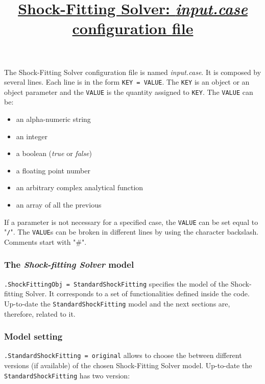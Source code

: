 \documentclass[11pt,a4paper,oneside]{article}
\begin{document}
\title{\underline{Shock-Fitting Solver: \textit{input.case} configuration file}}
\date{}
\maketitle
The Shock-Fitting Solver configuration file is named \textit{input.case}. 
It is composed by several lines. 
Each line is in the form \texttt{KEY = VALUE}.
The \texttt{KEY} is an object or an object parameter and the \texttt{VALUE} is the quantity assigned to \texttt{KEY}.
\newline
\newline
The \texttt{VALUE} can be:

\begin{itemize}
\item{an alpha-numeric string}
\item{an integer}
\item{a boolean (\textit{true} or \textit{false})}
\item{a floating point number}
\item{an arbitrary complex analytical function}
\item{an array of all the previous}
\end{itemize}

If a parameter is not necessary for a specified case, the \texttt{VALUE} can be set equal to "\texttt{/}".
The \texttt{VALUE}s can be broken in different lines by using the character backslash.
Comments start with "\#".


\subsubsection*{The \textit{Shock-fitting Solver} model}

\hspace*{1cm} \texttt{.ShockFittingObj = StandardShockFitting}
\newline
\newline
specifies the model of the Shock-fitting Solver. It corresponds to a set of functionalities defined inside the code.
Up-to-date the \texttt{StandardShockFitting} model and the next sections are, therefore, related to it.

\subsubsection*{Model setting}

\hspace*{1cm} \texttt{.StandardShockFitting = original}
\newline
\newline
allows to choose the between different versions (if available) of the chosen Shock-Fitting Solver model. 
\newline
Up-to-date the \texttt{StandardShockFitting} has two version:
\end{document}
